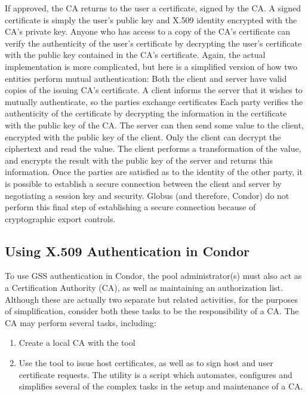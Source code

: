If approved, the CA returns to the user a certificate, signed by the CA.
A signed certificate is simply the user's public key and X.509 identity
encrypted with the CA's private key. Anyone who has access to a copy of
the CA's certificate can verify the authenticity of the user's certificate 
by decrypting the user's certificate with the public key contained in the
CA's certificate. Again, the actual implementation is more complicated, but
here is a simplified version of how two entities perform mutual authentication:
Both the client and server have valid copies of the issuing CA's certificate.
A client informs the server that it wishes to mutually authenticate, so the
parties exchange certificates Each party verifies the authenticity of the
certificate by decrypting the information in the certificate with the public
key of the CA.
The server can then send some value to the client, encrypted with the public 
key of the client.  Only the client can decrypt the ciphertext and read the 
value. The client performs a transformation of the value, and encrypts the 
result with the public key of the server and returns this information. Once
the parties are satisfied as to the identity of the other party, it is possible
to establish a secure connection between the client and server by negotiating 
a session key and security. Globus (and therefore, Condor) do not perform
this final step of establishing a secure connection because of cryptographic 
export controls.

\subsection{\label{sec:Condor-X509-Authentication}Using X.509 Authentication
in Condor}

To use GSS authentication in Condor, the pool administrator(s) must also
act as a Certification Authority (CA), as well as maintaining an authorization
list. Although these are actually two separate but related activities, for
the purposes of simplification, consider both these tasks to be the 
responsibility of a CA. The CA may perform several tasks, including:
\begin{enumerate}
\item Create a local CA with the tool 
\item Use the tool  to issue host certificates, as well
as to sign host and user certificate requests. The  utility
is a script which automates, configures and simplifies several of the complex
tasks in the setup and maintenance of a CA. 
\end{enumerate}


